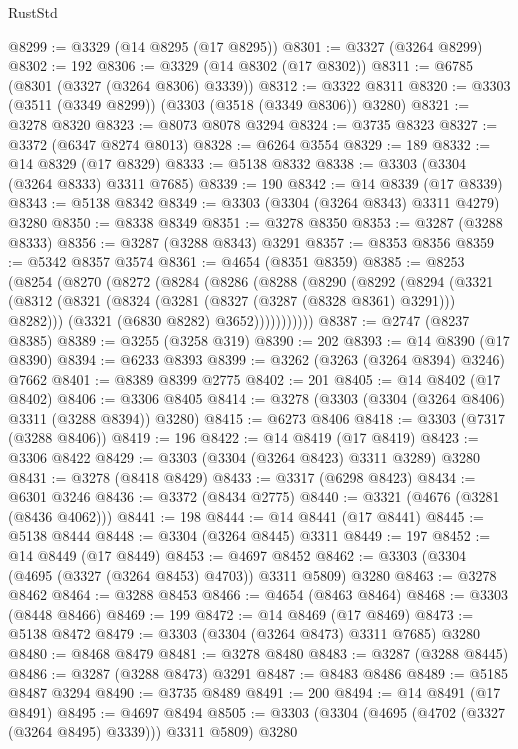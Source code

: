 \begin{lexlean}{RustStd}
\begin{coremodule}
{\begin{coremodule}
{{{{{{{{{{{{{{{{{{{{{{{{{{{{{{{{{@8299 := @3329 (@14 @8295 (@17 @8295))
@8301 := @3327 (@3264 @8299)
@8302 := 192
@8306 := @3329 (@14 @8302 (@17 @8302))
@8311 := @6785 (@8301 (@3327 (@3264 @8306) @3339))
@8312 := @3322 @8311
@8320 := @3303 (@3511 (@3349 @8299)) (@3303 (@3518 (@3349 @8306)) @3280)
@8321 := @3278 @8320
@8323 := @8073 @8078 @3294
@8324 := @3735 @8323
@8327 := @3372 (@6347 @8274 @8013)
@8328 := @6264 @3554
@8329 := 189
@8332 := @14 @8329 (@17 @8329)
@8333 := @5138 @8332
@8338 := @3303 (@3304 (@3264 @8333) @3311 @7685)
@8339 := 190
@8342 := @14 @8339 (@17 @8339)
@8343 := @5138 @8342
@8349 := @3303 (@3304 (@3264 @8343) @3311 @4279) @3280
@8350 := @8338 @8349
@8351 := @3278 @8350
@8353 := @3287 (@3288 @8333)
@8356 := @3287 (@3288 @8343) @3291
@8357 := @8353 @8356
@8359 := @5342 @8357 @3574
@8361 := @4654 (@8351 @8359)
@8385 := @8253
    (@8254
      (@8270
        (@8272
          (@8284
            (@8286
              (@8288
                (@8290
                  (@8292
                    (@8294
                      (@3321
                        (@8312 (@8321 (@8324 (@3281 (@8327 (@3287 (@8328 @8361) @3291))) @8282)))
                        (@3321 (@6830 @8282) @3652)))))))))))
@8387 := @2747 (@8237 @8385)
@8389 := @3255 (@3258 @319)
@8390 := 202
@8393 := @14 @8390 (@17 @8390)
@8394 := @6233 @8393
@8399 := @3262 (@3263 (@3264 @8394) @3246) @7662
@8401 := @8389 @8399 @2775
@8402 := 201
@8405 := @14 @8402 (@17 @8402)
@8406 := @3306 @8405
@8414 := @3278 (@3303 (@3304 (@3264 @8406) @3311 (@3288 @8394)) @3280)
@8415 := @6273 @8406
@8418 := @3303 (@7317 (@3288 @8406))
@8419 := 196
@8422 := @14 @8419 (@17 @8419)
@8423 := @3306 @8422
@8429 := @3303 (@3304 (@3264 @8423) @3311 @3289) @3280
@8431 := @3278 (@8418 @8429)
@8433 := @3317 (@6298 @8423)
@8434 := @6301 @3246
@8436 := @3372 (@8434 @2775)
@8440 := @3321 (@4676 (@3281 (@8436 @4062)))
@8441 := 198
@8444 := @14 @8441 (@17 @8441)
@8445 := @5138 @8444
@8448 := @3304 (@3264 @8445) @3311
@8449 := 197
@8452 := @14 @8449 (@17 @8449)
@8453 := @4697 @8452
@8462 := @3303 (@3304 (@4695 (@3327 (@3264 @8453) @4703)) @3311 @5809) @3280
@8463 := @3278 @8462
@8464 := @3288 @8453
@8466 := @4654 (@8463 @8464)
@8468 := @3303 (@8448 @8466)
@8469 := 199
@8472 := @14 @8469 (@17 @8469)
@8473 := @5138 @8472
@8479 := @3303 (@3304 (@3264 @8473) @3311 @7685) @3280
@8480 := @8468 @8479
@8481 := @3278 @8480
@8483 := @3287 (@3288 @8445)
@8486 := @3287 (@3288 @8473) @3291
@8487 := @8483 @8486
@8489 := @5185 @8487 @3294
@8490 := @3735 @8489
@8491 := 200
@8494 := @14 @8491 (@17 @8491)
@8495 := @4697 @8494
@8505 := @3303 (@3304 (@4695 (@4702 (@3327 (@3264 @8495) @3339))) @3311 @5809) @3280
}}}}}}}}}}}}}}}}}}}}}}}}}}}}}}}}}
\end{coremodule}}
\end{coremodule}
\end{lexlean}
